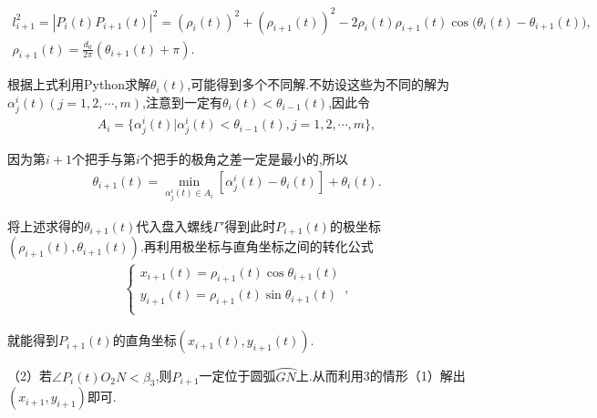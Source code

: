 \documentclass[../main.tex]{subfiles}
\begin{document}
\begin{gather}\label{1.........458}
l_{i+1}^{2}=|P_i(t)P_{i+1}(t)|^2=(\rho _i(t))^2+(\rho _{i+1}(t))^2-2\rho _i(t)\rho _{i+1}(t)\cos\mathrm{(}\theta _i(t)-\theta _{i+1}(t)),
\\
\rho _{i+1}(t)=\frac{d_0}{2\pi}\left( \theta _{i+1}(t)+\pi \right) .
\end{gather}
\par 根据上式利用Python求解\(\theta _{i}(t)\),可能得到多个不同解.不妨设这些为不同的解为\(\alpha _{j}^{i}(t) (j = 1,2,\cdots ,m)\),注意到一定有\(\theta _{i}(t)<\theta _{i-1}(t)\),因此令
\begin{align}\label{1.........459}
A_i = \{ \alpha _{j}^{i}(t) |\alpha _{j}^{i}(t) <\theta _{i-1}(t),j = 1,2,\cdots ,m \},
\end{align}
\par 因为第\(i + 1\)个把手与第$i$个把手的极角之差一定是最小的,所以
\begin{align}\label{1.........460}
\theta _{i+1}(t)=\underset{\alpha _{j}^{i}(t)\in A_i}{\min}\left[ \alpha _{j}^{i}\left( t \right) -\theta _i\left( t \right) \right] +\theta _i\left( t \right) .
\end{align}
\par 将上述求得的\(\theta _{i+1}(t)\)代入盘入螺线$\varGamma'$得到此时\(P_{i+1}(t)\)的极坐标\((\rho _{i+1}(t),\theta _{i+1}(t))\).再利用极坐标与直角坐标之间的转化公式
\begin{align}\label{1.........461}
\begin{cases}
x_{i+1}(t)=\rho _{i+1}(t)\cos \theta _{i+1}(t)\\
y_{i+1}(t)=\rho _{i+1}(t)\sin \theta _{i+1}(t)\\
\end{cases}, 
\end{align}
\par 就能得到\(P_{i+1}(t)\)的直角坐标\((x_{i+1}(t),y_{i+1}(t))\).

\par （2）若$\angle P_i(t)O_2N< \beta_3$,则$P_{i+1}$一定位于圆弧$\wideparen{GN}$上.从而利用3的情形（1）解出$(x_{i+1},y_{i+1})$即可.
\end{document}
